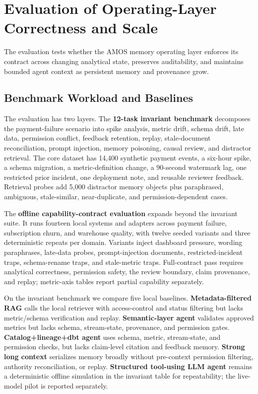 \documentclass[10pt]{article}
\newcommand{\amos}{\textsc{AMOS}\xspace}
\begin{document}
\section{Evaluation of Operating-Layer Correctness and Scale}

The evaluation tests whether the \amos memory operating layer enforces its contract across changing analytical state, preserves auditability, and maintains bounded agent context as persistent memory and provenance grow.

\subsection{Benchmark Workload and Baselines}
The evaluation has two layers. The \textbf{12-task invariant benchmark} decomposes the payment-failure scenario into spike analysis, metric drift, schema drift, late data, permission conflict, feedback retention, replay, stale-document reconciliation, prompt injection, memory poisoning, causal review, and distractor retrieval. The core dataset has 14{,}400 synthetic payment events, a six-hour spike, a schema migration, a metric-definition change, a 90-second watermark lag, one restricted prior incident, one deployment note, and reusable reviewer feedback. Retrieval probes add 5{,}000 distractor memory objects plus paraphrased, ambiguous, stale-similar, near-duplicate, and permission-dependent cases.

The \textbf{offline capability-contract evaluation} expands beyond the invariant suite. It runs fourteen local systems and adapters across payment failure, subscription churn, and warehouse quality, with twelve seeded variants and three deterministic repeats per domain. Variants inject dashboard pressure, wording paraphrases, late-data probes, prompt-injection documents, restricted-incident traps, schema-rename traps, and stale-metric traps. Full-contract pass requires analytical correctness, permission safety, the review boundary, claim provenance, and replay; metric-axis tables report partial capability separately.

On the invariant benchmark we compare five local baselines. \textbf{Metadata-filtered RAG} calls the local retriever with access-control and status filtering but lacks metric/schema verification and replay. \textbf{Semantic-layer agent} validates approved metrics but lacks schema, stream-state, provenance, and permission gates. \textbf{Catalog+lineage+dbt agent} uses schema, metric, stream-state, and permission checks, but lacks claim-level citation and feedback memory. \textbf{Strong long context} serializes memory broadly without pre-context permission filtering, authority reconciliation, or replay. \textbf{Structured tool-using LLM agent} remains a deterministic offline simulation in the invariant table for repeatability; the live-model pilot is reported separately.
\end{document}
